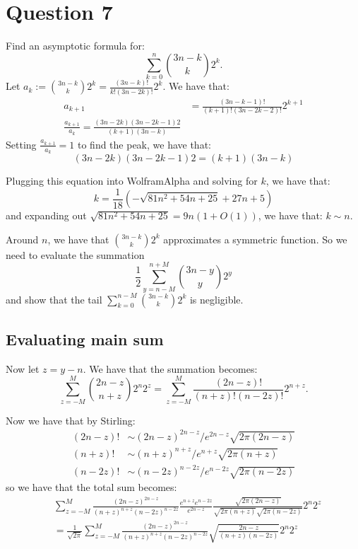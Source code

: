 \documentclass[]{article}
\theoremstyle{definition}
\numberwithin{theorem}{section}
\numberwithin{equation}{section}
\begin{document}
\section{Question 7}
Find an asymptotic formula for:
\begin{equation}
	\sum_{k = 0}^n \binom{3n - k}{k} 2^k.
\end{equation}
Let $a_k := \binom{3n - k}{k} 2^k = \frac{(3n - k)!}{k! (3n - 2k)!} 2^k$.
We have that:
\begin{align*}
	a_{k + 1} &= \frac{(3n - k - 1)!}{(k + 1)! (3n - 2k - 2)!} 2^{k + 1}\\
	\frac{a_{k + 1}}{a_k} = \frac{(3n - 2k)(3n - 2k - 1) 2}{(k + 1)(3n - k)}
\end{align*}
Setting $\frac{a_{k + 1}}{a_k} = 1$ to find the peak, we have that:
\begin{equation}
	(3n - 2k)(3n - 2k - 1) 2 = (k + 1)(3n - k)
\end{equation}

Plugging this equation into WolframAlpha and solving for $k$, we have that:
\begin{equation}
	k = \frac{1}{18}\left(- \sqrt{81 n^2 + 54 n + 25} + 27 n + 5\right)
\end{equation}
and expanding out $\sqrt{81 n^2 + 54 n + 25} = 9 n(1 + O(1))$, we have that:
$k \sim n$. 

Around $n$, we have that $\binom{3n - k}{k} 2^k$ approximates a symmetric function. So we need to evaluate the summation
\begin{equation}
	\frac{1}{2}\sum_{y = n - M}^{n + M} \binom{3n - y}{y} 2^y
\end{equation}
and show that the tail $\sum_{k = 0}^{n - M} \binom{3n - k}{k} 2^k$ is negligible.

\subsection{Evaluating main sum}
Now let $z = y - n$. We have that the summation becomes:
\begin{equation}
	\sum_{z = -M}^M \binom{2n - z}{n + z} 2^n 2^z = \sum_{z = -M}^M\frac{(2n - z)!}{(n + z)! (n - 2z)!} 2^{n + z}. 
\end{equation}

Now we have that by Stirling:
\begin{align*}
	(2n - z)! &\sim (2n - z)^{2n-z}/e^{2n - z} \sqrt{2 \pi (2n-z)}\\
	(n + z)! &\sim (n + z)^{n + z}/e^{n + z} \sqrt{2 \pi (n + z)}\\
	(n - 2z)! &\sim (n - 2z)^{n - 2z}/e^{n - 2z} \sqrt{2 \pi (n -2z)}
\end{align*}
so we have that the total sum becomes:
\begin{align*}
	&\sum_{z = -M}^M \frac{(2n - z)^{2n - z}}{(n + z)^{n + z} (n - 2z)^{n - 2z}} \frac{e^{n + z} e^{n - 2z}}{e^{2n - z}} \frac{\sqrt{2\pi (2n - z)}}{\sqrt{2\pi (n + z)} \sqrt{2\pi (n - 2z)}} 2^{n} 2^z \\
	&= \frac{1}{\sqrt{2\pi}}\sum_{z = -M}^M \frac{(2n - z)^{2n - z}}{(n + z)^{n + z} (n - 2z)^{n - 2z}} \sqrt{\frac{2n - z}{(n + z)(n - 2z)}} 2^{n} 2^z
\end{align*}
\end{document}
